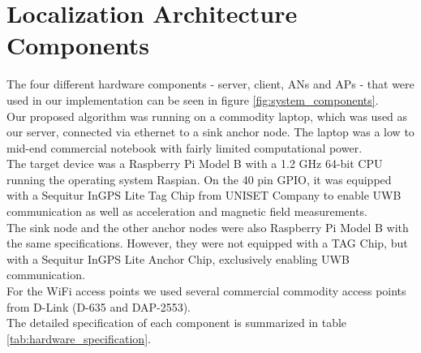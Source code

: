 \section{Localization Architecture Components}
The four different hardware components - server, client, ANs and APs - that were used in our implementation can be seen in figure \ref{fig:system_components}.\\
\noindent\hspace*{5mm}%
Our proposed algorithm was running on a commodity laptop, which was used as our server, connected via ethernet to a sink anchor node. The laptop was a low to mid-end commercial notebook with fairly limited computational power.\\
\noindent\hspace*{5mm}%
The target device was a Raspberry Pi Model B \cite{Raspberry} with a 1.2 GHz 64-bit CPU running the operating system Raspian. On the 40 pin GPIO, it was equipped with a Sequitur InGPS Lite Tag Chip from UNISET Company to enable UWB communication as well as acceleration and magnetic field measurements.\\
\noindent\hspace*{5mm}%
The sink node and the other anchor nodes were also Raspberry Pi Model B with the same specifications. However, they were not equipped with a TAG Chip, but with a Sequitur InGPS Lite Anchor Chip, exclusively enabling UWB communication.\\
\noindent\hspace*{5mm}%
For the WiFi access points we used several commercial commodity access points from D-Link (D-635 and DAP-2553).\\
\noindent\hspace*{5mm}%
The detailed specification of each component is summarized in table \ref{tab:hardware_specification}.

